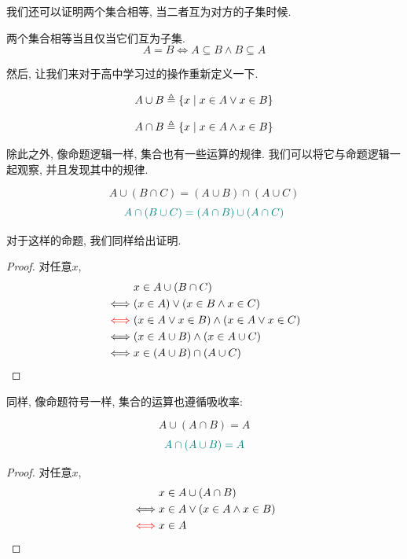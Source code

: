 我们还可以证明两个集合相等, 当二者互为对方的子集时候. 

\begin{theorem}
    两个集合相等当且仅当它们互为子集. 
    \[
      A = B \iff A \subseteq B \land B \subseteq A
    \]
\end{theorem}

然后, 让我们来对于高中学习过的操作重新定义一下. 

\begin{definition}
    \[
      A \cup B \triangleq \{ x \mid x \in A \lor x \in B\}
    \]
\end{definition}

\begin{definition}
    \[
      A \cap B \triangleq \{x \mid x \in A \land x \in B\}
    \]
\end{definition}

除此之外, 像命题逻辑一样, 集合也有一些运算的规律. 我们可以将它与命题逻辑一起观察, 并且发现其中的规律. 

\begin{theorem}
    \[
      A \cup (B \cap C) = (A \cup B) \cap (A \cup C)
    \]
    \[
      \textcolor{teal}{A \cap (B \cup C) = (A \cap B) \cup (A \cap C)}
    \]
\end{theorem}

对于这样的命题, 我们同样给出证明. 

\begin{proof}
    对任意$x$,
    \begin{align*}
        &x \in A \cup (B \cap C) \\
        \iff & (x \in A) \lor (x \in B \land x \in C) \\
        \textcolor{red}{\iff} & (x \in A \lor x \in B) \land (x \in A \lor x \in C) \\
        \iff & (x \in A \cup B) \land (x \in A \cup C) \\
        \iff & x \in (A \cup B) \cap (A \cup C)
      \end{align*}
\end{proof}

同样, 像命题符号一样, 集合的运算也遵循吸收率: 

\begin{theorem}
    \[
      A \cup (A \cap B) = A
    \]
    \[
      \textcolor{teal}{A \cap (A \cup B) = A}
    \]
\end{theorem}

\begin{proof}
    对任意$x$,
    \begin{align*}
        &x \in A \cup (A \cap B) \\
        \iff & x \in A \lor (x \in A \land x \in B) \\
        \textcolor{red}{\iff} & x \in A
      \end{align*}
\end{proof}

